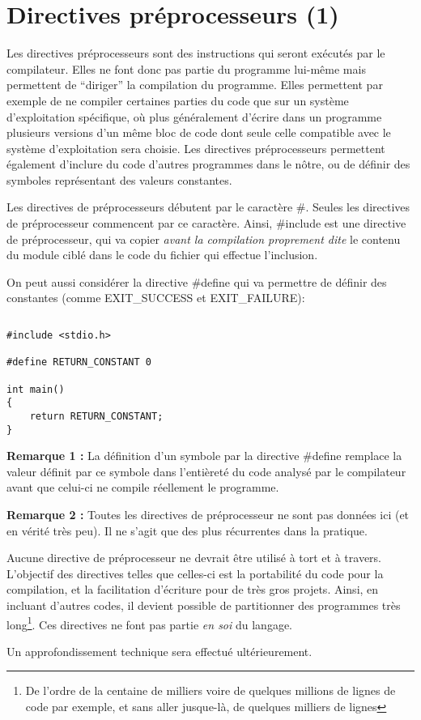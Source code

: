 \documentclass[../../../main.tex]{subfiles}
\begin{document}
\section{Directives préprocesseurs (1)}
Les directives préprocesseurs sont des instructions qui seront exécutés par le compilateur. Elles ne font donc pas partie du programme lui-même mais permettent de ``diriger'' la compilation du programme. Elles permettent par exemple de ne compiler certaines parties du code que sur un système d'exploitation spécifique, où plus généralement d'écrire dans un programme plusieurs versions d'un même bloc de code dont seule celle compatible avec le système d'exploitation sera choisie. Les directives préprocesseurs permettent également d'inclure du code d'autres programmes dans le nôtre, ou de définir des symboles représentant des valeurs constantes.
 
Les directives de préprocesseurs débutent par le caractère \#. Seules les directives de préprocesseur commencent par ce caractère. Ainsi, \textsf{\#include} est une directive de préprocesseur, qui va copier \textit{avant la compilation proprement dite} le contenu du module ciblé dans le code du fichier qui effectue l'inclusion.
 
On peut aussi considérer la directive \textsf{\#define} qui va permettre de définir des constantes (comme \textsf{EXIT\_SUCCESS} et \textsf{EXIT\_FAILURE}):
\begin{lstlisting}[title=Exemple]
\end{lstlisting}
\begin{verbatim}
#include <stdio.h>

#define RETURN_CONSTANT 0

int main()
{
	return RETURN_CONSTANT;
}
\end{verbatim}
\textbf{Remarque 1 :} La définition d'un symbole par la directive \textsf{\#define} remplace la valeur définit par ce symbole dans l'entièreté du code analysé par le compilateur avant que celui-ci ne compile réellement le programme.
 
\textbf{Remarque 2 :} Toutes les directives de préprocesseur ne sont pas données ici (et en vérité très peu). Il ne s'agit que des plus récurrentes dans la pratique.
 
Aucune directive de préprocesseur ne devrait être utilisé à tort et à travers. L'objectif des directives telles que celles-ci est la portabilité du code pour la compilation, et la facilitation d'écriture pour de très gros projets. Ainsi, en incluant d'autres codes, il devient possible de partitionner des programmes très long\footnote{De l'ordre de la centaine de milliers voire de	quelques millions de lignes de code par exemple, et sans aller jusque-là, de quelques milliers de lignes}. Ces directives ne font pas partie \textit{en soi} du langage.
 
Un approfondissement technique sera effectué ultérieurement.
\end{document}
